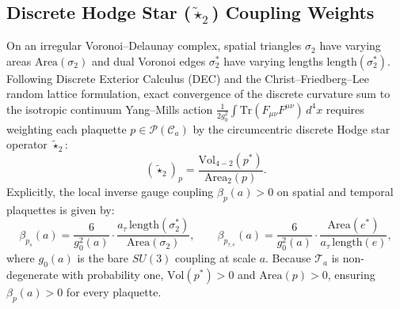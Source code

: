 \documentclass[11pt, a4paper]{article}
\theoremstyle{definition}
\theoremstyle{remark}
\begin{document}
\subsection{Discrete Hodge Star ($\tilde{\star}_{2}$) Coupling Weights}

On an irregular Voronoi--Delaunay complex, spatial triangles $\sigma_{2}$ have varying areas $\mathrm{Area}(\sigma_{2})$ and dual Voronoi edges $\sigma_{2}^{*}$ have varying lengths $\mathrm{length}(\sigma_{2}^{*})$. Following Discrete Exterior Calculus (DEC) and the Christ--Friedberg--Lee random lattice formulation, exact convergence of the discrete curvature sum to the isotropic continuum Yang--Mills action $\frac{1}{2g_{0}^{2}}\int \mathrm{Tr}(F_{\mu\nu}F^{\mu\nu})\,d^{4}x$ requires weighting each plaquette $p \in \mathcal{P}(\mathcal{C}_{a})$ by the circumcentric discrete Hodge star operator $\tilde{\star}_{2}$:
\begin{equation}
  (\tilde{\star}_{2})_{p} = \frac{\mathrm{Vol}_{4-2}(p^{*})}{\mathrm{Area}_{2}(p)}.
\end{equation}
Explicitly, the local inverse gauge coupling $\beta_{p}(a) > 0$ on spatial and temporal plaquettes is given by:
\begin{equation}
  \beta_{p_{s}}(a) = \frac{6}{g_{0}^{2}(a)} \cdot \frac{a_{\tau}\,\mathrm{length}(\sigma_{2}^{*})}{\mathrm{Area}(\sigma_{2})}, \qquad
  \beta_{p_{\tau, e}}(a) = \frac{6}{g_{0}^{2}(a)} \cdot \frac{\mathrm{Area}(e^{*})}{a_{\tau}\,\mathrm{length}(e)},
\end{equation}
where $g_{0}(a)$ is the bare $SU(3)$ coupling at scale $a$. Because $\mathcal{T}_{a}$ is non-degenerate with probability one, $\mathrm{Vol}(p^{*}) > 0$ and $\mathrm{Area}(p) > 0$, ensuring $\beta_{p}(a) > 0$ for every plaquette.
\end{document}
